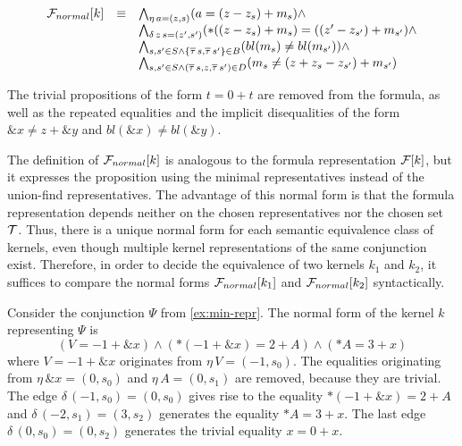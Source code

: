 \[
    \begin{array}{lll}
        \mathcal{F}_{normal}[k] & \equiv & \bigwedge_{\eta\,a=(z,s)} (a = (z - z_s) + m_s) \land                                                                     \\
                       &        & \bigwedge_{\delta\,z\,s=(z',s')} (*((z-z_s) + m_s) = ((z'-z_{s'}) + m_{s'}) \land                                         \\
                       &        & \bigwedge_{s,s' \in S \land \{\overline{\tau}\,s,\overline{\tau}\,s'\}\in B} (bl(m_{s}) \neq bl(m_{s'})) \land           \\
                       &        & \bigwedge_{s,s' \in S \land (\overline{\tau}\,s, z,\overline{\tau}\,s') \in D} (m_{s} \neq (z+ z_{s} -z_{s'}) + m_{s'})
    \end{array}
\]

The trivial propositions of the form $t = 0 + t$ are removed from the formula, as well as the repeated equalities and the implicit disequalities of the form $\&x \neq z + \&y$ and $bl(\&x) \neq bl(\&y)$.

The definition of $\mathcal{F}_{normal}[k]$ is analogous to the formula representation $\mathcal{F}[k]$, but it expresses the proposition using the minimal representatives instead of the union-find representatives.
The advantage of this normal form is that the formula representation depends neither on the chosen representatives nor the chosen set $\mathcal{T}$.
Thus, there is a unique normal form for each semantic equivalence class of kernels, even though multiple kernel representations of the same conjunction exist.
Therefore, in order to decide the equivalence of two kernels $k_1$ and $k_2$, it suffices to compare the normal forms $\mathcal{F}_{normal}[k_1]$ and $\mathcal{F}_{normal}[k_2]$ syntactically.

\begin{example}
    Consider the conjunction $\Psi$ from \cref{ex:min-repr}.
    The normal form of the kernel $k$ representing $\Psi$ is
    \[
        (V = -1+\&x) \land (*(-1 + \&x) = 2 + A) \land (*A = 3 + x)
    \]
    where $V = -1 + \&x$ originates from $\eta\,V = (-1,s_0)$.
    The equalities originating from $\eta\,\&x = (0,s_0)$ and $\eta\,A = (0, s_1)$ are removed, because they are trivial.
    The edge $\delta\,(-1,s_0) = (0,s_0)$ gives rise to the equality $*(-1 + \&x) = 2 + A$ and $\delta\,(-2,s_1) = (3,s_2)$ generates the equality $*A = 3 + x$.
    The last edge $\delta\,(0,s_0) = (0,s_2)$ generates the trivial equality $x = 0 + x$.
\end{example}

